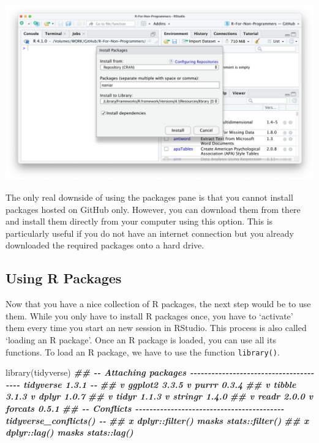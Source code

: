 \documentclass[
]{book}
\newenvironment{Shaded}{\begin{snugshade}}{\end{snugshade}}
\newcommand{\DocumentationTok}[1]{\textcolor[rgb]{0.56,0.35,0.01}{\textbf{\textit{#1}}}}
\newcommand{\FunctionTok}[1]{\textcolor[rgb]{0.00,0.00,0.00}{#1}}
\newcommand{\NormalTok}[1]{#1}
\begin{document}
\begin{enumerate}
  \includegraphics{images/chapter_05_img/install_r_packages/03_install_r_packages.png}
\end{enumerate}

The only real downside of using the packages pane is that you cannot install packages hosted on GitHub only. However, you can download them from there and install them directly from your computer using this option. This is particularly useful if you do not have an internet connection but you already downloaded the required packages onto a hard drive.

\hypertarget{using-r-packages}{%
\subsection{Using R Packages}\label{using-r-packages}}

Now that you have a nice collection of R packages, the next step would be to use them. While you only have to install R packages once, you have to `activate' them every time you start an new session in RStudio. This process is also called `loading an R package'. Once an R package is loaded, you can use all its functions. To load an R package, we have to use the function \texttt{library()}.

\begin{Shaded}
\begin{Highlighting}[]
\FunctionTok{library}\NormalTok{(tidyverse)}
\DocumentationTok{\#\# {-}{-} Attaching packages {-}{-}{-}{-}{-}{-}{-}{-}{-}{-}{-}{-}{-}{-}{-}{-}{-}{-}{-}{-}{-}{-}{-}{-}{-}{-}{-}{-}{-}{-}{-}{-}{-}{-}{-}{-}{-}{-}{-} tidyverse 1.3.1 {-}{-}}
\DocumentationTok{\#\# v ggplot2 3.3.5     v purrr   0.3.4}
\DocumentationTok{\#\# v tibble  3.1.3     v dplyr   1.0.7}
\DocumentationTok{\#\# v tidyr   1.1.3     v stringr 1.4.0}
\DocumentationTok{\#\# v readr   2.0.0     v forcats 0.5.1}
\DocumentationTok{\#\# {-}{-} Conflicts {-}{-}{-}{-}{-}{-}{-}{-}{-}{-}{-}{-}{-}{-}{-}{-}{-}{-}{-}{-}{-}{-}{-}{-}{-}{-}{-}{-}{-}{-}{-}{-}{-}{-}{-}{-}{-}{-}{-}{-}{-}{-} tidyverse\_conflicts() {-}{-}}
\DocumentationTok{\#\# x dplyr::filter() masks stats::filter()}
\DocumentationTok{\#\# x dplyr::lag()    masks stats::lag()}
\end{Highlighting}
\end{Shaded}
\end{document}
